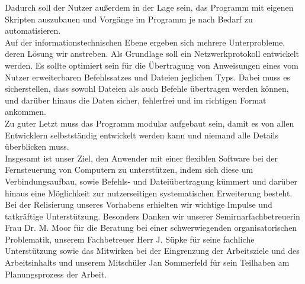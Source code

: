 Dadurch soll der Nutzer außerdem in der Lage sein, das Programm mit eigenen Skripten auszubauen und Vorgänge im Programm je nach Bedarf zu automatisieren.\\
Auf der informationstechnischen Ebene ergeben sich mehrere Unterprobleme, deren Lösung wir anstreben. Als Grundlage soll ein Netzwerkprotokoll entwickelt werden.
Es sollte optimiert sein für die Übertragung von Anweisungen eines vom Nutzer erweiterbaren Befehlssatzes und Dateien jeglichen Typs. Dabei muss es sicherstellen, dass sowohl Dateien als auch Befehle übertragen werden können, und darüber hinaus die Daten sicher, fehlerfrei und im richtigen Format ankommen.\\
Zu guter Letzt muss das Programm modular aufgebaut sein, damit es von allen Entwicklern selbstständig entwickelt werden kann und niemand alle Details überblicken muss.\\
Insgesamt ist unser Ziel, den Anwender mit einer flexiblen Software bei der Fernsteuerung von Computern zu unterstützen, indem sich diese um Verbindungsaufbau, sowie Befehls- und Dateiübertragung kümmert und darüber hinaus eine Möglichkeit zur nutzerseitigen systematischen Erweiterung besteht.\\

Bei der Relisierung unseres Vorhabens erhielten wir wichtige Impulse und tatkräftige Unterstützung. Besonders Danken wir unserer Semirnarfachbetreuerin Frau Dr. M. Moor für die Beratung bei einer schwerwiegenden organisatorischen Problematik, unserem Fachbetreuer Herr J. Süpke für seine fachliche Unterstützung sowie das Mitwirken bei der Eingrenzung der Arbeitsziele und des Arbeitsinhalts und unserem Mitschüler Jan Sommerfeld für sein Teilhaben am Planungsprozess der Arbeit.  
%
